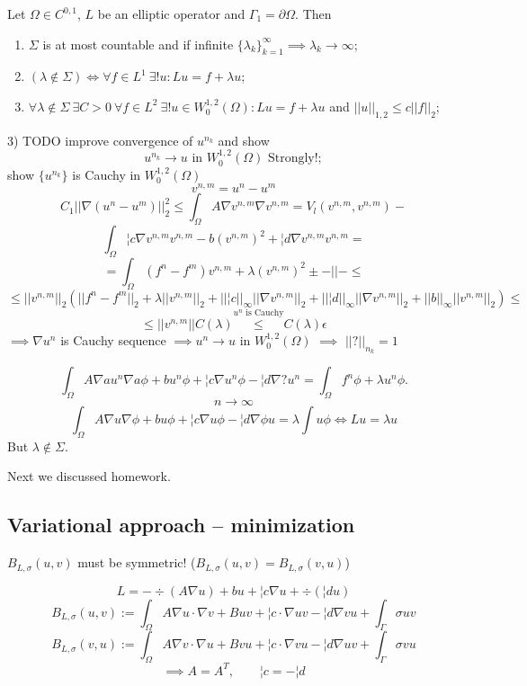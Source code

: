 \documentclass[12pt]{article}					%
\begin{document}
\begin{veta}
	Let $\Omega \in C^{0, 1}$, $L$ be an elliptic operator and $\Gamma_1 = \partial \Omega$. Then
	\begin{enumerate}
		\item $\Sigma$ is at most countable and if infinite $\{\lambda_k\}_{k=1}^∞ \implies \lambda_k \rightarrow ∞$;
		\item $(\lambda \notin \Sigma) \Leftrightarrow \forall f \in L^1\ \exists! u: Lu = f + \lambda u$;
		\item $\forall \lambda \notin \Sigma\ \exists C > 0\ \forall f \in L^2\ \exists! u \in W_0^{1,2}(\Omega): Lu = f + \lambda u$ and $||u||_{1,2} ≤ c ||f||_2$;
	\end{enumerate}

	\begin{dukazin}
		3) TODO
		improve convergence of $u^{n_k}$ and show
		$$ u^{n_k} \rightarrow u \text{ in } W_0^{1, 2}(\Omega) \text{ Strongly!}; $$
		show $\{u^{n_k}\}$ is Cauchy in $W_0^{1, 2}(\Omega)$
		$$ v^{n, m} = u^n - u^m $$
		$$ C_1||\nabla (u^n - u^m)||_2^2 ≤ \int_{\Omega} A \nabla v^{n, m} \nabla v^{n, m} = V_l(v^{n, m}, v^{n, m}) - $$
		$$ \int_\Omega ¦c \nabla  v^{n, m}v^{n, m} - b(v^{n, m})^2 + ¦d \nabla v^{n, m}v^{n, m} = $$
		$$ = \int_\Omega (f^n - f^m) v^{n, m} + \lambda(v^{n, m})^2 ± -||- ≤ $$
		$$ ≤ ||v^{n, m}||_2 (||f^n - f^m||_2 + \lambda ||v^{n, m}||_2 + ||¦c||_∞ ||\nabla v^{n, m}||_2 + ||¦d||_∞ ||\nabla v^{n, m}||_2 + ||b||_∞ ||v^{n, m}||_2) ≤$$
		$$ ≤ ||v^{n, m}|| C(\lambda) \overset{u^n \text{ is Cauchy}} ≤ C(\lambda) \epsilon $$
		$\implies \nabla u^n$ is Cauchy sequence $\implies u^n \rightarrow u$ in $W_0^{1, 2}(\Omega)$ $\implies$ $||?||_{n_k} = 1$

		$$ \int_\Omega A \nabla a u^n \nabla a \phi + b u^n \phi + ¦c \nabla u^n \phi - ¦d \nabla ? u^n = \int_\Omega f^n \phi + \lambda u^n \phi. $$
		$$ n \rightarrow ∞ $$
		$$ \int_\Omega A \nabla u \nabla \phi + b u \phi + ¦c \nabla u \phi - ¦d \nabla \phi u = \lambda \int u \phi \Leftrightarrow Lu = \lambda u $$
		But $\lambda \notin \Sigma$.
	\end{dukazin}
\end{veta}

\begin{poznamka}
	Next we discussed homework.
\end{poznamka}


\subsection{Variational approach – minimization}
\begin{poznamka}
	$B_{L, \sigma}(u, v)$ must be symmetric! ($B_{L, \sigma}(u, v) = B_{L, \sigma}(v, u)$)

	$$ L = - \div (A \nabla u) + b u + ¦c \nabla u + \div (¦d u) $$
	$$ B_{L, \sigma}(u, v) := \int_{\Omega} A \nabla u·\nabla v + B u v + ¦c·\nabla u v - ¦d \nabla v u + \int_{\Gamma} \sigma u v $$
	$$ B_{L, \sigma}(v, u) := \int_{\Omega} A \nabla v·\nabla u + B v u + ¦c·\nabla v u - ¦d \nabla u v + \int_{\Gamma} \sigma v u $$
	$$ \implies A = A^T, \qquad ¦c = -¦d $$
\end{poznamka}
\end{document}
